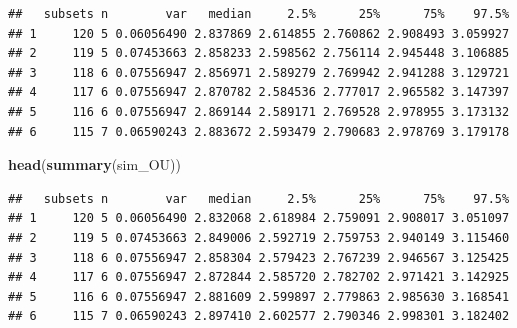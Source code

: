 \documentclass[]{book}
\newenvironment{Shaded}{\begin{snugshade}}{\end{snugshade}}
\newcommand{\KeywordTok}[1]{\textcolor[rgb]{0.13,0.29,0.53}{\textbf{#1}}}
\newcommand{\DataTypeTok}[1]{\textcolor[rgb]{0.13,0.29,0.53}{#1}}
\newcommand{\StringTok}[1]{\textcolor[rgb]{0.31,0.60,0.02}{#1}}
\newcommand{\OtherTok}[1]{\textcolor[rgb]{0.56,0.35,0.01}{#1}}
\newcommand{\NormalTok}[1]{#1}
\theoremstyle{definition}
\theoremstyle{definition}
\theoremstyle{definition}
\theoremstyle{remark}
\begin{document}
\begin{verbatim}
##   subsets n        var   median     2.5%      25%      75%    97.5%
## 1     120 5 0.06056490 2.837869 2.614855 2.760862 2.908493 3.059927
## 2     119 5 0.07453663 2.858233 2.598562 2.756114 2.945448 3.106885
## 3     118 6 0.07556947 2.856971 2.589279 2.769942 2.941288 3.129721
## 4     117 6 0.07556947 2.870782 2.584536 2.777017 2.965582 3.147397
## 5     116 6 0.07556947 2.869144 2.589171 2.769528 2.978955 3.173132
## 6     115 7 0.06590243 2.883672 2.593479 2.790683 2.978769 3.179178
\end{verbatim}

\begin{Shaded}
\begin{Highlighting}[]
\KeywordTok{head}\NormalTok{(}\KeywordTok{summary}\NormalTok{(sim_OU))}
\end{Highlighting}
\end{Shaded}

\begin{verbatim}
##   subsets n        var   median     2.5%      25%      75%    97.5%
## 1     120 5 0.06056490 2.832068 2.618984 2.759091 2.908017 3.051097
## 2     119 5 0.07453663 2.849006 2.592719 2.759753 2.940149 3.115460
## 3     118 6 0.07556947 2.858304 2.579423 2.767239 2.946567 3.125425
## 4     117 6 0.07556947 2.872844 2.585720 2.782702 2.971421 3.142925
## 5     116 6 0.07556947 2.881609 2.599897 2.779863 2.985630 3.168541
## 6     115 7 0.06590243 2.897410 2.602577 2.790346 2.998301 3.182402
\end{verbatim}

\begin{Shaded}
\end{Shaded}
\end{document}
